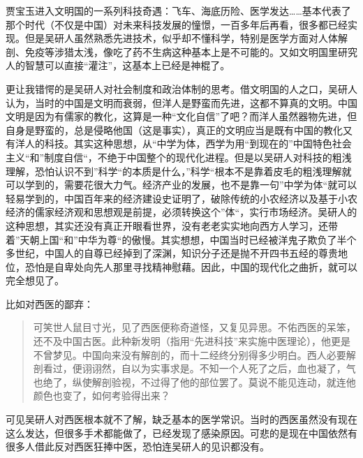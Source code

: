 贾宝玉进入文明国的一系列科技奇遇：飞车、海底历险、医学发达……基本代表了那个时代（不仅是中国）对未来科技发展的憧憬，一百多年后再看，很多都已经实现。但是吴研人虽然熟悉先进技术，似乎却不懂科学，特别是医学方面对人体解剖、免疫等涉猎太浅，像吃了药不生病这种基本上是不可能的。又如文明国里研究人的智慧可以直接“灌注”，这基本上已经是神棍了。

更让我错愕的是吴研人对社会制度和政治体制的思考。借文明国的人之口，吴研人认为，当时的中国是文明而衰弱，但洋人是野蛮而先进，这都不算真的文明。中国文明是因为有儒家的教化，这算是一种“文化自信”了吧？而洋人虽然器物先进，但自身是野蛮的，总是侵略他国（这是事实），真正的文明应当是既有中国的教化又有洋人的科技。其实这种思想，从“中学为体，西学为用“到现在的”中国特色社会主义“和”制度自信“，不绝于中国整个的现代化进程。但是以吴研人对科技的粗浅理解，恐怕认识不到”科学“的本质是什么，”科学“根本不是靠着皮毛的粗浅理解就可以学到的，需要花很大力气。经济产业的发展，也不是靠一句”中学为体“就可以轻易学到的，中国百年来的经济建设史证明了，破除传统的小农经济以及基于小农经济的儒家经济观和思想观是前提，必须转换这个”体“，实行市场经济。吴研人的这种思想，其实还没有真正开眼看世界，没有老老实实地向西方人学习，还带着”天朝上国“和”中华为尊“的傲慢。其实想想，中国当时已经被洋鬼子欺负了半个多世纪，中国人的自尊已经掉到了深渊，知识分子还是抛不开四书五经的尊贵地位，恐怕是自卑处向先人那里寻找精神慰藉。因此，中国的现代化之曲折，就可以完全想见了。

比如对西医的鄙弃：
\begin{quotation}
	可笑世人鼠目寸光，见了西医便称奇道怪，又复见异思。不佑西医的呆笨，还不及中国古医。此种新发明（指用“先进科技”来实施中医理论），他更是不曾梦见。中国向来没有解剖的，而十二经终分别得多少明白。西人必要解剖看过，便诩诩然，自以为实事求是。不知一个人死了之后，血也凝了，气也绝了，纵使解剖验视，不过得了他的部位罢了。莫说不能见连动，就连他颜色也变了，如何考验得出来？
\end{quotation}

可见吴研人对西医根本就不了解，缺乏基本的医学常识。当时的西医虽然没有现在这么发达，但很多手术都能做了，已经发现了感染原因。可悲的是现在中国依然有很多人借此反对西医狂捧中医，恐怕连吴研人的见识都没有。


